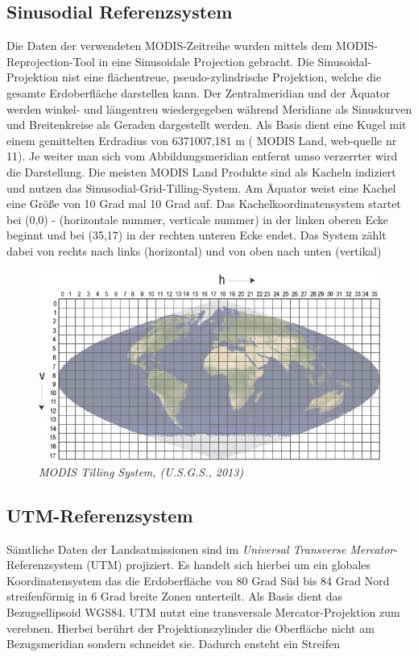\documentclass[11pt]{report}
\begin{document}
\subsection{Sinusodial Referenzsystem}
Die Daten der verwendeten MODIS-Zeitreihe wurden mittels dem MODIS-Reprojection-Tool in eine Sinusoidale Projection gebracht. Die Sinusoidal-Projektion nist eine flächentreue, pseudo-zylindrische Projektion, welche die gesamte Erdoberfläche darstellen kann. Der Zentralmeridian und der Äquator werden winkel- und längentreu wiedergegeben während Meridiane als Sinuskurven und Breitenkreise als Geraden dargestellt werden. Als Basis dient eine Kugel mit einem gemittelten Erdradius von 6371007,181 m ( MODIS Land, web-quelle nr 11). Je weiter man sich vom Abbildungsmeridian entfernt umso verzerrter wird die Darstellung. Die meisten MODIS Land Produkte sind als Kacheln indiziert und nutzen das Sinusodial-Grid-Tilling-System. Am Äquator weist eine Kachel eine Größe von 10 Grad mal 10 Grad auf. Das Kachelkoordinatensystem startet bei (0,0) - (horizontale nummer, verticale nummer) in der linken oberen Ecke beginnt und bei (35,17) in der rechten unteren Ecke endet. Das System zählt dabei von rechts nach links (horizontal) und von oben nach unten (vertikal)

\begin{figure}[H]
\centering
\includegraphics[scale=0.6]{./Grafiken/RefSys/modis_sinusoidal_grid.jpg}
\caption{\textit{MODIS Tilling System, (U.S.G.S., 2013)}}
\end{figure}



\subsection{UTM-Referenzsystem}
Sämtliche Daten der Landsatmissionen sind im \textit{Universal Transverse Mercator}-Referenzsystem (UTM) projiziert. Es handelt sich hierbei um ein globales Koordinatensystem das die Erdoberfläche von 80 Grad Süd bis 84 Grad Nord streifenförmig in 6 Grad breite Zonen unterteilt. Als Basis dient das Bezugsellipsoid WGS84. UTM nutzt eine transversale Mercator-Projektion zum verebnen. Hierbei berührt der Projektionszylinder die Oberfläche nicht am Bezugsmeridian sondern schneidet sie. Dadurch ensteht ein Streifen
\end{document}
